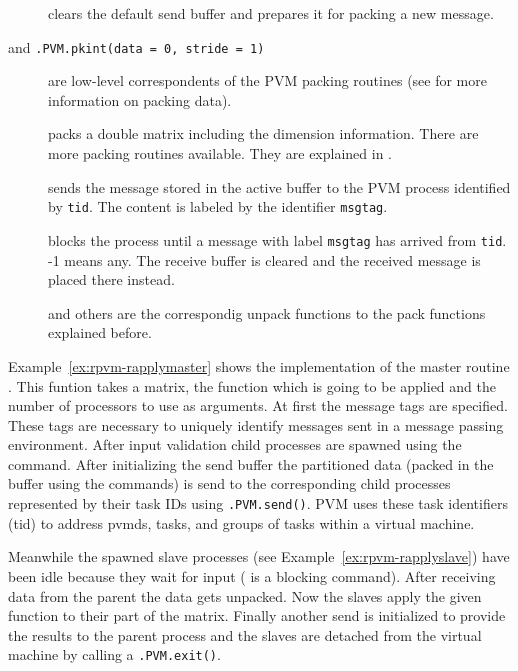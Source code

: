 \begin{description}

\item[] clears the default send buffer and
  prepares it for packing a new message.
\item[ and \texttt{.PVM.pkint(data =
    0, stride = 1)}] are low-level correspondents of the PVM packing
    routines (see \cite{geist94pvm} for more information on packing
    data). 
\item[] packs a double matrix including
  the dimension information. There are more packing routines
  available. They are explained in \cite{nali07rpvm}.
\item[] sends the message stored in the
  active buffer to the PVM process identified by \texttt{tid}. The
  content is labeled by the identifier \texttt{msgtag}.
\item[] blocks the process
  until a message with label \texttt{msgtag} has arrived from
  \texttt{tid}. -1 means any. The receive buffer is cleared
  and the received message is placed there instead.
\item[] and
  others are the correspondig unpack functions to the
  pack functions explained before.
\end{description}

Example~\ref{ex:rpvm-rapplymaster} shows the implementation of the
master routine . This funtion takes a matrix,
the function which is going to be applied and the number of processors
to use as arguments. At first 
the message tags are specified. These tags are necessary to uniquely
identify messages sent in a message passing environment. After
input validation  child processes are spawned using the
 command. After initializing the send buffer the
partitioned data (packed in the buffer using the 
commands) is send to the corresponding child processes represented by
their task IDs using
\texttt{.PVM.send()}. PVM uses these task identifiers (tid) to
address pvmds, tasks, and groups of tasks within a virtual
machine.

Meanwhile the spawned slave processes (see
Example~\ref{ex:rpvm-rapplyslave}) have been idle because they wait
for input ( is a blocking command). After
receiving data from the parent the data gets unpacked. Now the slaves
apply the given function to their part of the matrix. Finally another
send is initialized to provide the results to the parent process and
the slaves are detached from the virtual machine by calling a
\texttt{.PVM.exit()}. 

